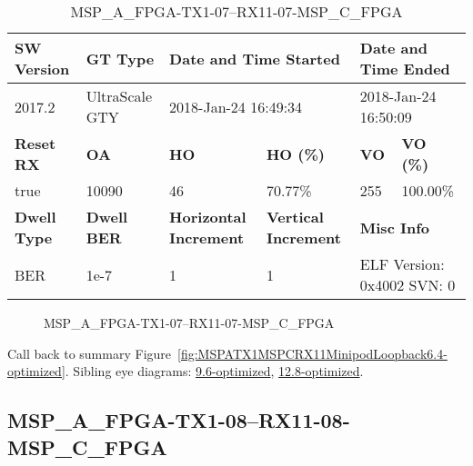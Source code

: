 \begin{table}[h]
\centering
\caption{MSP\_A\_FPGA-TX1-07--RX11-07-MSP\_C\_FPGA}
\label{tab:MSPAFPGATX107RX1107MSPCFPGA6.4-optimized}
\begin{tabular}{@{}|l|l|l|l|l|l|@{}}
\toprule
\textbf{SW Version}                & \textbf{GT Type}   & \multicolumn{2}{l|}{\textbf{Date and Time Started}}            & \multicolumn{2}{l|}{\textbf{Date and Time Ended}}        \\ \midrule
2017.2                       & UltraScale GTY          & \multicolumn{2}{l|}{2018-Jan-24 16:49:34}                   & \multicolumn{2}{l|}{2018-Jan-24 16:50:09}               \\ \midrule
\textbf{Reset RX}                  & \textbf{OA} & \textbf{HO}   & \textbf{HO (\%)} & \textbf{VO} & \textbf{VO (\%)} \\ \midrule
true & 10090        & 46          & 70.77\%        & 255        & 100.00\%       \\ \midrule
\textbf{Dwell Type}                & \textbf{Dwell BER} & \textbf{Horizontal Increment} & \textbf{Vertical Increment}    & \multicolumn{2}{l|}{\textbf{Misc Info}}                  \\ \midrule
BER                            & 1e-7        & 1        & 1           & \multicolumn{2}{l|}{ELF Version: 0x4002 SVN: 0}                         \\ \bottomrule
\end{tabular}
\end{table}

\begin{figure}[h]
\caption{MSP\_A\_FPGA-TX1-07--RX11-07-MSP\_C\_FPGA} \label{fig:MSPAFPGATX107RX1107MSPCFPGA6.4-optimized}
\end{figure}

Call back to summary Figure~\ref{fig:MSPATX1MSPCRX11MinipodLoopback6.4-optimized}.
Sibling eye diagrams: \hyperref[sec:MSPAFPGATX107RX1107MSPCFPGA9.6-optimized]{9.6-optimized}, \hyperref[sec:MSPAFPGATX107RX1107MSPCFPGA12.8-optimized]{12.8-optimized}.

\clearpage
\newpage


\subsection{MSP\_A\_FPGA-TX1-08--RX11-08-MSP\_C\_FPGA}\label{sec:MSPAFPGATX108RX1108MSPCFPGA6.4-optimized}

